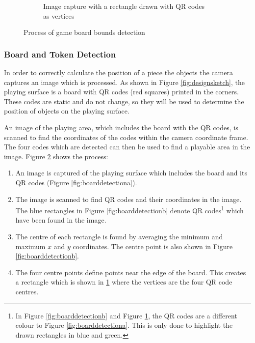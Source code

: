 \documentclass[12pt]{article}
\begin{document}
\begin{figure}[H]
\begin{subfigure}{0.65\textwidth}
        \caption{Image capture with a rectangle drawn with QR codes as vertices}
        \label{fig:boarddetectionc}
    \end{subfigure}
    \caption{Process of game board bounds detection}
    \label{fig:boarddetection}
\end{figure}

\subsubsection{Board and Token Detection}
In order to correctly calculate the position of a piece the objects the camera captures an image which is processed. 
As shown in Figure \ref{fig:designsketch}, the playing surface is a board with QR codes (red squares) printed in the corners. 
These codes are static and do not change, so they will be used to determine the position of objects on the playing surface.

An image of the playing area, which includes the board with the QR codes, is scanned to find the coordinates of the codes within the camera coordinate frame. 
The four codes which are detected can then be used to find a playable area in the image. Figure \ref{fig:boarddetection} shows the process:

\begin{enumerate}
    \item An image is captured of the playing surface which includes the board and its QR codes (Figure \ref{fig:boarddetectiona}).
    \item The image is scanned to find QR codes and their coordinates in the image. The blue rectangles in Figure \ref{fig:boarddetectionb} denote QR codes\footnote{In Figure \ref{fig:boarddetectionb} and Figure \ref{fig:boarddetectionc}, the QR codes are a different colour to Figure \ref{fig:boarddetectiona}. This is only done to highlight the drawn rectangles in blue and green.} which have been found in the image.
    \item The centre of each rectangle is found by averaging the minimum and maximum $x$ and $y$ coordinates. The centre point is also shown in Figure \ref{fig:boarddetectionb}.
    \item The four centre points define points near the edge of the board. This creates a rectangle which is shown in \ref{fig:boarddetectionc} where the vertices are the four QR code centres. 
\end{enumerate}
\end{document}
